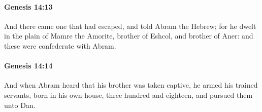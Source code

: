 		\paragraph{Genesis 14:13} %
			\label{GENESIS-14-13}

			And there came one that had escaped, and told Abram the Hebrew; for he dwelt in the plain of Mamre the Amorite, brother of Eshcol, and brother of Aner: and these were confederate with Abram.


		\paragraph{Genesis 14:14} %
			\label{GENESIS-14-14}

			And when Abram heard that his brother was taken captive, he armed his trained servants, born in his own house, three hundred and eighteen, and pursued them unto Dan.


